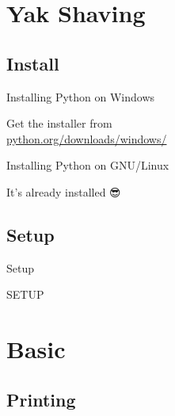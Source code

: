 

\newfontfamily{}



\maketitle

\section{Yak Shaving}

\subsection{Install}

\begin{xframe}{Installing Python on Windows}
  \begin{center}
    {\huge Get the installer from} \\
    \href{https://www.python.org/downloads/windows/}{python.org/downloads/windows/}
  \end{center}
\end{xframe}

\begin{xframe}{Installing Python on GNU/Linux}
  \begin{center}
    \huge It's already installed {\DejaSans 😎}
  \end{center}
\end{xframe}

\subsection{Setup}
\label{subsec:label}

\begin{xframe}{Setup}
  \begin{center}
    \huge SETUP
  \end{center}
\end{xframe}


\section{Basic}

\subsection{Printing}

